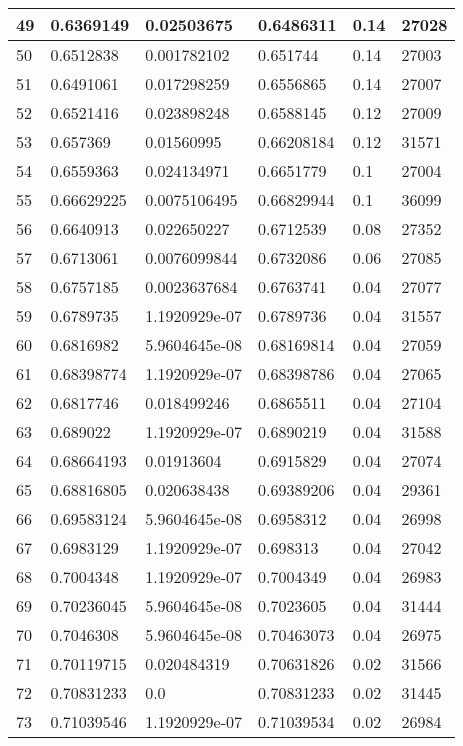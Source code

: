 \begin{longtable}{|l|l|l|l|l|l|}
49 & 0.6369149 & 0.02503675 & 0.6486311 & 0.14 & 27028 \\ \hline 
50 & 0.6512838 & 0.001782102 & 0.651744 & 0.14 & 27003 \\ \hline 
51 & 0.6491061 & 0.017298259 & 0.6556865 & 0.14 & 27007 \\ \hline 
52 & 0.6521416 & 0.023898248 & 0.6588145 & 0.12 & 27009 \\ \hline 
53 & 0.657369 & 0.01560995 & 0.66208184 & 0.12 & 31571 \\ \hline 
54 & 0.6559363 & 0.024134971 & 0.6651779 & 0.1 & 27004 \\ \hline 
55 & 0.66629225 & 0.0075106495 & 0.66829944 & 0.1 & 36099 \\ \hline 
56 & 0.6640913 & 0.022650227 & 0.6712539 & 0.08 & 27352 \\ \hline 
57 & 0.6713061 & 0.0076099844 & 0.6732086 & 0.06 & 27085 \\ \hline 
58 & 0.6757185 & 0.0023637684 & 0.6763741 & 0.04 & 27077 \\ \hline 
59 & 0.6789735 & 1.1920929e-07 & 0.6789736 & 0.04 & 31557 \\ \hline 
60 & 0.6816982 & 5.9604645e-08 & 0.68169814 & 0.04 & 27059 \\ \hline 
61 & 0.68398774 & 1.1920929e-07 & 0.68398786 & 0.04 & 27065 \\ \hline 
62 & 0.6817746 & 0.018499246 & 0.6865511 & 0.04 & 27104 \\ \hline 
63 & 0.689022 & 1.1920929e-07 & 0.6890219 & 0.04 & 31588 \\ \hline 
64 & 0.68664193 & 0.01913604 & 0.6915829 & 0.04 & 27074 \\ \hline 
65 & 0.68816805 & 0.020638438 & 0.69389206 & 0.04 & 29361 \\ \hline 
66 & 0.69583124 & 5.9604645e-08 & 0.6958312 & 0.04 & 26998 \\ \hline 
67 & 0.6983129 & 1.1920929e-07 & 0.698313 & 0.04 & 27042 \\ \hline 
68 & 0.7004348 & 1.1920929e-07 & 0.7004349 & 0.04 & 26983 \\ \hline 
69 & 0.70236045 & 5.9604645e-08 & 0.7023605 & 0.04 & 31444 \\ \hline 
70 & 0.7046308 & 5.9604645e-08 & 0.70463073 & 0.04 & 26975 \\ \hline 
71 & 0.70119715 & 0.020484319 & 0.70631826 & 0.02 & 31566 \\ \hline 
72 & 0.70831233 & 0.0 & 0.70831233 & 0.02 & 31445 \\ \hline 
73 & 0.71039546 & 1.1920929e-07 & 0.71039534 & 0.02 & 26984 \\ \hline 

\end{longtable}
